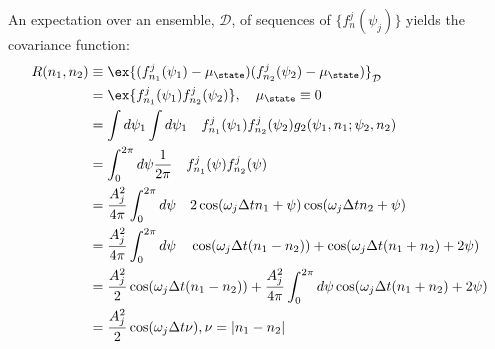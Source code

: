 An expectation over an ensemble, $\mathcal{D}$, of sequences of $ \{ f^j_n(\psi_j) \}$ yields the covariance function:
\begin{align}
R(n_1, n_2) &\equiv \ex{(f^j_{n_1}(\psi_1) - \mu_\state )(f^j_{n_2}(\psi_2) - \mu_\state )}_\mathcal{D} \\
& = \ex{f^j_{n_1}(\psi_1) f^j_{n_2}(\psi_2)},  \quad \mu_\state \equiv 0 \\
& = \int  d\psi_1  \int  d\psi_1  \quad f^j_{n_1}(\psi_1) f^j_{n_2}(\psi_2) g_2(\psi_1, n_1; \psi_2, n_2) \\
& = \int_0^{2\pi} d \psi \frac{1}{2\pi} \quad f^j_{n_1}(\psi) f^j_{n_2}(\psi) \\
& = \frac{A_j^2}{4\pi} \int_0^{2\pi} d \psi \quad 2\cos(\omega_j \Delta t n_1 + \psi) \cos(\omega_j \Delta t n_2 + \psi) \\
& = \frac{A_j^2}{4\pi} \int_0^{2\pi} d \psi \quad \cos(\omega_j \Delta t (n_1 -n_2))  + \cos(\omega_j \Delta t (n_1 + n_2) + 2\psi) \\
& = \frac{A_j^2}{2} \cos(\omega_j \Delta t (n_1 -n_2))  + \frac{A_j^2}{4 \pi}\int_0^{2\pi} d \psi  \cos(\omega_j \Delta t (n_1 + n_2) + 2\psi) \\
& = \frac{A_j^2}{2} \cos(\omega_j \Delta t \nu), \nu = |n_1 -n_2|
\end{align}

